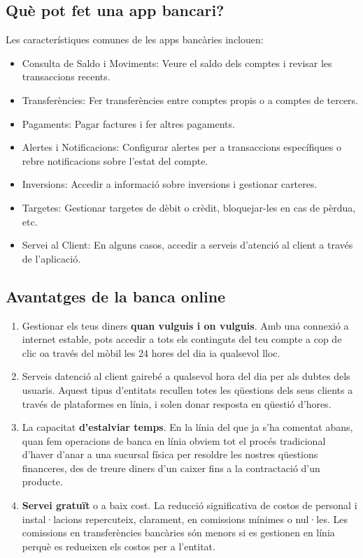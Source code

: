 \subsection*{Què pot fet una app bancari?}

Les característiques comunes de les apps bancàries inclouen:

\begin{itemize}
    \item Consulta de Saldo i Moviments: Veure el saldo dels comptes i revisar les transaccions recents.
    \item Transferències: Fer transferències entre comptes propis o a comptes de tercers.
    \item  Pagaments: Pagar factures i fer altres pagaments.
    \item Alertes i Notificacions: Configurar alertes per a transaccions específiques o rebre notificacions sobre l'estat del compte.
    \item Inversions: Accedir a informació sobre inversions i gestionar carteres.
    \item Targetes: Gestionar targetes de dèbit o crèdit, bloquejar-les en cas de pèrdua, etc.
    \item Servei al Client: En alguns casos, accedir a serveis d'atenció al client a través de l'aplicació.
\end{itemize}


\subsection*{Avantatges de la banca online}


\begin{enumerate}
    \item Gestionar els teus diners \textbf{quan vulguis i on vulguis}. Amb una connexió a internet estable, pots accedir a tots els continguts del teu compte a cop de clic oa través del mòbil les 24 hores del dia ia qualsevol lloc.
    \item Serveis datenció al client gairebé a qualsevol hora del dia per als dubtes dels usuaris. Aquest tipus d'entitats recullen totes les qüestions dels seus clients a través de plataformes en línia, i solen donar resposta en qüestió d'hores.
    \item La capacitat \textbf{d'estalviar temps}. En la línia del que ja s'ha comentat abans, quan fem operacions de banca en línia obviem tot el procés tradicional d'haver d'anar a una sucursal física per resoldre les nostres qüestions financeres, des de treure diners d'un caixer fins a la contractació d'un producte.
    \item \textbf{Servei gratuït} o a baix cost. La reducció significativa de costos de personal i instal·lacions repercuteix, clarament, en comissions mínimes o nul·les. Les comissions en transferències bancàries són menors si es gestionen en línia perquè es redueixen els costos per a l'entitat.
\end{enumerate}




